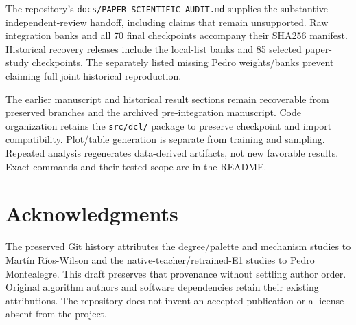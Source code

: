 \documentclass[
  11pt,
]{article}
\begin{document}
The repository's \texttt{docs/PAPER\_SCIENTIFIC\_AUDIT.md} supplies the
substantive independent-review handoff, including claims that remain
unsupported. Raw integration banks and all 70 final checkpoints
accompany their SHA256 manifest. Historical recovery releases include
the local-list banks and 85 selected paper-study checkpoints. The
separately listed missing Pedro weights/banks prevent claiming full
joint historical reproduction.

The earlier manuscript and historical result sections remain recoverable
from preserved branches and the archived pre-integration manuscript.
Code organization retains the \texttt{src/dcl/} package to preserve
checkpoint and import compatibility. Plot/table generation is separate
from training and sampling. Repeated analysis regenerates data-derived
artifacts, not new favorable results. Exact commands and their tested
scope are in the README.

\section*{Acknowledgments}\label{acknowledgments}

The preserved Git history attributes the degree/palette and mechanism
studies to Martín Ríos-Wilson and the native-teacher/retrained-E1
studies to Pedro Montealegre. This draft preserves that provenance
without settling author order. Original algorithm authors and software
dependencies retain their existing attributions. The repository does not
invent an accepted publication or a license absent from the project.


\end{document}
